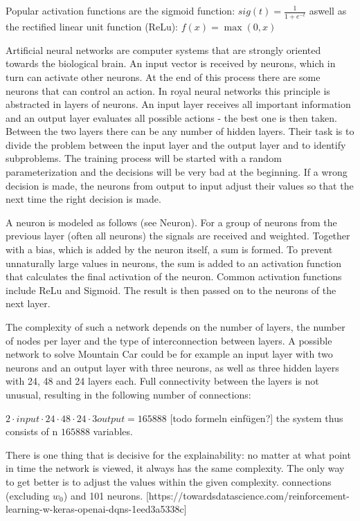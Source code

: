 Popular activation functions are the sigmoid function:
${sig}(t) = \frac{1}{1 + e^{-t}}$
aswell as the rectified linear unit function (ReLu):
$f(x)=\max(0,x)$



Artificial neural networks are computer systems that are strongly oriented towards the biological brain. An input vector is received by neurons, which in turn can activate other neurons. At the end of this process there are some neurons that can control an action.
In royal neural networks this principle is abstracted in layers of neurons. An input layer receives all important information and an output layer evaluates all possible actions - the best one is then taken. Between the two layers there can be any number of hidden layers. Their task is to divide the problem between the input layer and the output layer and to identify subproblems. The training process will be started with a random parameterization and the decisions will be very bad at the beginning. If a wrong decision is made, the neurons from output to input adjust their values so that the next time the right decision is made.

A neuron is modeled as follows (see Neuron). For a group of neurons from the previous layer (often all neurons) the signals are received and weighted. Together with a bias, which is added by the neuron itself, a sum is formed. To prevent unnaturally large values in neurons, the sum is added to an activation function that calculates the final activation of the neuron. Common activation functions include ReLu and Sigmoid. The result is then passed on to the neurons of the next layer.

The complexity of such a network depends on the number of layers, the number of nodes per layer and the type of interconnection between layers.
A possible network to solve Mountain Car could be for example an input layer with two neurons and an output layer with three neurons, as well as three hidden layers with 24, 48 and 24 layers each. Full connectivity between the layers is not unusual, resulting in the following number of connections:

 $2 \cdot {input} \cdot 24 \cdot 48 \cdot 24 \cdot 3 {output} = 165888$
 [todo formeln einfügen?]
the system thus consists of n $165888$ variables.

There is one thing that is decisive for the explainability: no matter at what point in time the network is viewed, it always has the same complexity. The only way to get better is to adjust the values within the given complexity.
connections (excluding $w_0$) and 101 neurons. [https://towardsdatascience.com/reinforcement-learning-w-keras-openai-dqns-1eed3a5338c] 

